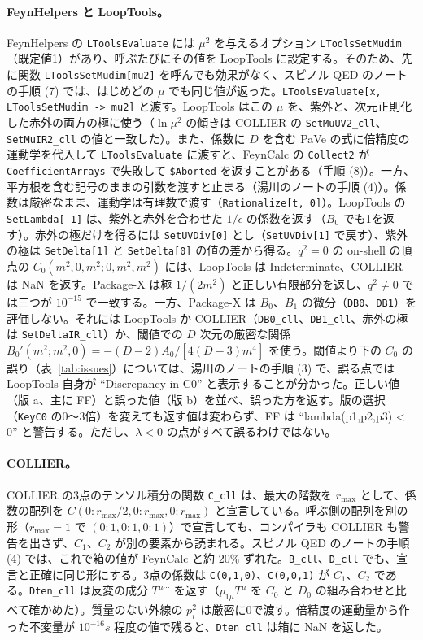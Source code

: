 \documentclass[a4paper,10pt]{ltjsarticle}
\begin{document}
\paragraph{FeynHelpers と LoopTools。}FeynHelpers の \texttt{LToolsEvaluate} には $\mu^2$ を与えるオプション \texttt{LToolsSetMudim}（既定値1）があり、呼ぶたびにその値を LoopTools に設定する。そのため、先に関数 \texttt{LToolsSetMudim[mu2]} を呼んでも効果がなく、スピノル QED のノートの手順 (7) では、はじめどの $\mu$ でも同じ値が返った。\texttt{LToolsEvaluate[x, LToolsSetMudim -> mu2]} と渡す。LoopTools はこの $\mu$ を、紫外と、次元正則化した赤外の両方の極に使う（$\ln\mu^2$ の傾きは COLLIER の \texttt{SetMuUV2\_cll}、\texttt{SetMuIR2\_cll} の値と一致した）。また、係数に $D$ を含む PaVe の式に倍精度の運動学を代入して \texttt{LToolsEvaluate} に渡すと、FeynCalc の \texttt{Collect2} が \texttt{CoefficientArrays} で失敗して \texttt{\$Aborted} を返すことがある（手順 (8)）。一方、平方根を含む記号のままの引数を渡すと止まる（湯川のノートの手順 (4)）。係数は厳密なまま、運動学は有理数で渡す（\texttt{Rationalize[t, 0]}）。LoopTools の \texttt{SetLambda[-1]} は、紫外と赤外を合わせた $1/\epsilon$ の係数を返す（$B_0$ でも1を返す）。赤外の極だけを得るには \texttt{SetUVDiv[0]} とし（\texttt{SetUVDiv[1]} で戻す）、紫外の極は \texttt{SetDelta[1]} と \texttt{SetDelta[0]} の値の差から得る。$q^2=0$ の on-shell の頂点の $C_0(m^2,0,m^2;0,m^2,m^2)$ には、LoopTools は Indeterminate、COLLIER は NaN を返す。Package-X は極 $1/(2m^2)$ と正しい有限部分を返し、$q^2\ne0$ では三つが $10^{-15}$ で一致する。一方、Package-X は $B_0$、$B_1$ の微分（\texttt{DB0}、\texttt{DB1}）を評価しない。それには LoopTools か COLLIER（\texttt{DB0\_cll}、\texttt{DB1\_cll}、赤外の極は \texttt{SetDeltaIR\_cll}）か、閾値での $D$ 次元の厳密な関係 $B_0'(m^2;m^2,0)=-(D-2)A_0/[4(D-3)m^4]$ を使う。閾値より下の $C_0$ の誤り（表~\ref{tab:issues}）については、湯川のノートの手順 (3) で、誤る点では LoopTools 自身が ``Discrepancy in C0'' と表示することが分かった。正しい値（版 a、主に FF）と誤った値（版 b）を並べ、誤った方を返す。版の選択（\texttt{KeyC0} の0〜3倍）を変えても返す値は変わらず、FF は ``lambda(p1,p2,p3) < 0'' と警告する。ただし、$\lambda<0$ の点がすべて誤るわけではない。

\paragraph{COLLIER。}COLLIER の3点のテンソル積分の関数 \texttt{C\_cll} は、最大の階数を $r_{\max}$ として、係数の配列を $C(0{:}r_{\max}/2,0{:}r_{\max},0{:}r_{\max})$ と宣言している。呼ぶ側の配列を別の形（$r_{\max}=1$ で $(0{:}1,0{:}1,0{:}1)$）で宣言しても、コンパイラも COLLIER も警告を出さず、$C_1$、$C_2$ が別の要素から読まれる。スピノル QED のノートの手順 (4) では、これで箱の値が FeynCalc と約 $20\%$ ずれた。\texttt{B\_cll}、\texttt{D\_cll} でも、宣言と正確に同じ形にする。3点の係数は \texttt{C(0,1,0)}、\texttt{C(0,0,1)} が $C_1$、$C_2$ である。\texttt{Dten\_cll} は反変の成分 $T^{\mu\cdots}$ を返す（$p_{1\mu}T^\mu$ を $C_0$ と $D_0$ の組み合わせと比べて確かめた）。質量のない外線の $p_i^2$ は厳密に0で渡す。倍精度の運動量から作った不変量が $10^{-16}s$ 程度の値で残ると、\texttt{Dten\_cll} は箱に NaN を返した。
\end{document}
